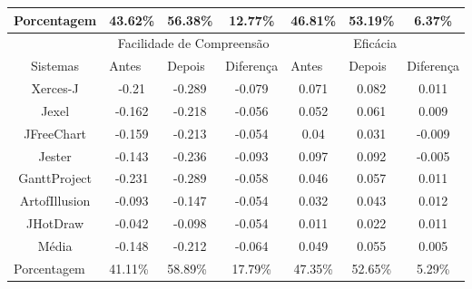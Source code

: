 \begin{table}[h]
\begin{tabular}{c|l|l|l|l|l|l|}
\multicolumn{1}{|l|}{Porcentagem}   & 43.62\%       & 56.38\%       &\multicolumn{1}{c|}{12.77\%}                & 46.81\%   & 53.19\%   & \multicolumn{1}{c|}{6.37\%}\\ \hline
                                    & \multicolumn{3}{c|}{Facilidade de Compreensão} & \multicolumn{3}{c|}{Eficácia}      \\ \hline
\multicolumn{1}{|c|}{Sistemas}      & Antes         & Depois        & Diferença      & Antes     & Depois    & Diferença  \\ \hline
\multicolumn{1}{|c|}{Xerces-J}      & \multicolumn{1}{c|}{-0.21}& \multicolumn{1}{c|}{-0.289}          &\multicolumn{1}{c|}{-0.079}&\multicolumn{1}{c|}{0.071}&\multicolumn{1}{c|}{0.082}&\multicolumn{1}{c|}{0.011}            \\ \hline
\multicolumn{1}{|c|}{Jexel}         & \multicolumn{1}{c|}{-0.162}          & \multicolumn{1}{c|}{-0.218}          &\multicolumn{1}{c|}{-0.056} & \multicolumn{1}{c|}{0.052}          & \multicolumn{1}{c|}{0.061}          &\multicolumn{1}{c|}{0.009}            \\ \hline
\multicolumn{1}{|c|}{JFreeChart}    & \multicolumn{1}{c|}{-0.159}          & \multicolumn{1}{c|}{-0.213} &\multicolumn{1}{c|}{-0.054}&\multicolumn{1}{c|}{0.04}&\multicolumn{1}{c|}{0.031}&\multicolumn{1}{c|}{-0.009}\\ \hline
\multicolumn{1}{|c|}{Jester}        & \multicolumn{1}{c|}{-0.143}          & \multicolumn{1}{c|}{-0.236}          &\multicolumn{1}{c|}{-0.093}&\multicolumn{1}{c|}{0.097}&\multicolumn{1}{c|}{0.092}&\multicolumn{1}{c|}{-0.005}\\ \hline
\multicolumn{1}{|c|}{GanttProject}  & \multicolumn{1}{c|}{-0.231}          & \multicolumn{1}{c|}{-0.289}          &\multicolumn{1}{c|}{-0.058}&\multicolumn{1}{c|}{0.046}&\multicolumn{1}{c|}{0.057}&\multicolumn{1}{c|}{0.011}\\ \hline
\multicolumn{1}{|c|}{ArtofIllusion} & \multicolumn{1}{c|}{-0.093}          & \multicolumn{1}{c|}{-0.147}          &\multicolumn{1}{c|}{-0.054}&\multicolumn{1}{c|}{0.032}&\multicolumn{1}{c|}{0.043}&\multicolumn{1}{c|}{0.012}\\ \hline
\multicolumn{1}{|c|}{JHotDraw}             & \multicolumn{1}{c|}{-0.042}          & \multicolumn{1}{c|}{-0.098}          &\multicolumn{1}{c|}{-0.054}&\multicolumn{1}{c|}{0.011}&\multicolumn{1}{c|}{0.022}&\multicolumn{1}{c|}{0.011}\\ \hline
\multicolumn{1}{|c|}{Média}         & \multicolumn{1}{c|}{-0.148}         & \multicolumn{1}{c|}{-0.212}         &\multicolumn{1}{c|}{-0.064}&\multicolumn{1}{c|}{0.049}&\multicolumn{1}{c|}{0.055}&\multicolumn{1}{c|}{0.005}\\ \hline
\multicolumn{1}{|l|}{Porcentagem}   & 41.11\%       & 58.89\%       &\multicolumn{1}{c|}{17.79\%}&  \multicolumn{1}{c|}{47.35\%}  &  \multicolumn{1}{c|}{52.65\%}  &\multicolumn{1}{c|}{5.29\%}\\ \hline
\end{tabular}
\end{table}

